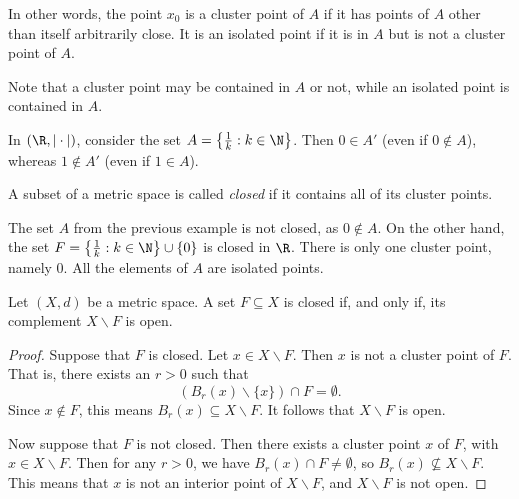 In other words, the point $x_0$ is a cluster point of $A$ if it has points
of $A$ other than itself arbitrarily close. It is an isolated point if it is in $A$ but is not a cluster point of $A$.

Note that a cluster point may be contained in $A$ or not, while an isolated point is contained in $A$.




\begin{example}
In $(\R, |\cdot|)$, consider the set $A = \left\{\frac{1}{k}: k \in \N\right\}$. Then $0 \in A'$ (even if $0\notin A$), whereas $1 \not\in A'$ (even if $1\in A$).
\end{example}

\begin{definition}
A subset of a metric space is called \emph{closed} if it contains
all of its cluster points.
\end{definition}

\begin{example}
The set $A$ from the previous example is not closed, as $0 \not\in A$.
On the other hand, the set $F = \left\{\frac{1}{k}: k \in \N\right\} \cup \{0\}$ is closed in $\R$.
There is only one cluster point, namely $0$. All the elements of $A$ are isolated points.
\end{example}


\begin{theorem} \label{thm:complement}
Let $(X,d)$ be a metric space. A set $F \subseteq X$ is closed if, and only if, its complement
$X \backslash F$ is open.
\end{theorem}

\np

\begin{proof}
Suppose that $F$ is closed. Let $x \in X \backslash F$. Then $x$ is not a cluster point of $F$.
That is, there exists an $r > 0$ such that
\[
(B_r(x) \backslash \{x\}) \cap F = \emptyset.
\]
Since $x \not\in F$, this means $B_r(x) \subseteq X \backslash F$. It follows that
$X \backslash F$ is open.

Now suppose that $F$ is not closed. Then there exists a cluster point $x$ of $F$, with 
$x \in X \backslash F$. Then for any $r > 0$, we have $B_r(x) \cap F \not= \emptyset$,
so $B_r(x) \not\subseteq X \backslash F$. This means that $x$ is not an interior point
of $X \backslash F$, and $X \backslash F$ is not open.
\end{proof}


